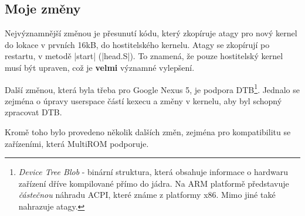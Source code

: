 \documentclass[12pt, a4paper, oneside]{article}
\newcommand{\B}{\textbf} %
\newcommand{\It}{\textit}  %
\begin{document}
\subsection*{Moje změny}
Nejvýznamnější změnou je přesunutí kódu, který zkopíruje atagy pro nový kernel do lokace v prvních 16kB, do hostitelského kernelu. Atagy se zkopírují po restartu, v metodě |start| (|head.S|). To znamená, že pouze hostitelský kernel musí být upraven, což je \B{velmi} významné vylepšení.

Další změnou, která byla třeba pro Google Nexus 5, je podpora DTB\footnote{\It{Device Tree Blob} - binární struktura, která obsahuje informace o hardwaru zařízení dříve kompilované přímo do jádra. Na ARM platformě představuje \It{částečnou} náhradu ACPI, které známe z platformy x86. Mimo jiné také nahrazuje atagy.}. Jednalo se zejména o úpravy userspace částí kexecu a změny v kernelu, aby byl schopný zpracovat DTB.

Kromě toho bylo provedeno několik dalších změn, zejména pro kompatibilitu se zařízeními, která MultiROM podporuje.


\newpage
\end{document}
